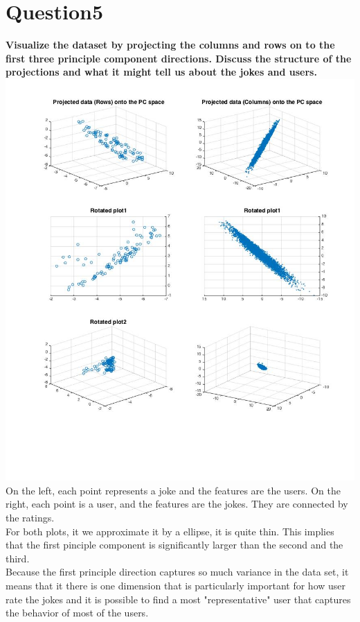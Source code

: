 \documentclass[paper=a4, fontsize=11pt]{scrartcl} %
\numberwithin{equation}{section} %
\numberwithin{figure}{section} %
\numberwithin{table}{section} %
\begin{document}
\section*{Question5}
\textbf{Visualize the dataset by projecting the columns and rows on to the first three principle component directions. Discuss the structure of the projections and what it might tell us about the jokes and users.}\\
\includegraphics[scale=.5]{5_scat.jpg}\\

On the left, each point represents a joke and the features are the users. On the right, each point is a user, and the features are the jokes. They are connected by the ratings. \\

For both plots, it we approximate it by a ellipse, it is quite thin. This implies that the first pinciple component is significantly larger than the second and the third. \\

Because the first principle direction captures so much variance in the data set, it means that it there is one dimension that is particularly important for how user rate the jokes and it is possible to find a most "representative" user that captures the behavior of most of the users. 
\end{document}
